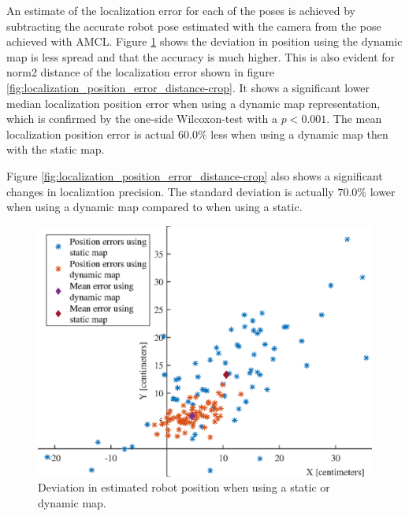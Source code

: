 An estimate of the localization error for each of the poses is achieved by subtracting the accurate robot pose estimated with the camera from the pose achieved with AMCL.
Figure \ref{fig:precision_test_positions} shows the deviation in position using the dynamic map is less spread and that the accuracy is much higher.
This is also evident for norm2 distance of the localization error shown in figure \ref{fig:localization_position_error_distance-crop}. 
It shows a significant lower median localization position error when using a dynamic map representation, which is confirmed by the one-side Wilcoxon-test with a $p<0.001$.
The mean localization position error is actual $60.0\%$ less when using a dynamic map then with the static map.

Figure \ref{fig:localization_position_error_distance-crop} also shows a significant changes in localization precision. 
The standard deviation is actually $70.0\%$ lower when using a dynamic map compared to when using a static.

\begin{figure}
    \centering
    \includegraphics[scale=1]{chapters/evaluation/figures/Localization_position_errors}
    \caption{Deviation in estimated robot position when using a static or dynamic map.}
    \label{fig:precision_test_positions}
\end{figure}

